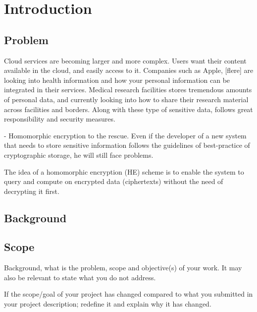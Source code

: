 \chapter{Introduction}
\label{chp:introduction}

\section{Problem}

Cloud services are becoming larger and more complex. Users want their content available in the cloud, and easily access to it. Companies such as Apple, [flere] are looking into health information and how your personal information can be integrated in their services. Medical research facilities stores tremendous amounts of personal data, and currently looking into how to share their research material across facilities and borders. \cite{iDASH} Along with these type of sensitive data, follows great responsibility and security measures. 


- Homomorphic encryption to the rescue. Even if the developer of a new system that needs to store sensitive information follows the guidelines of best-practice of cryptographic storage, he will still face problems.

The idea of a homomorphic encryption (HE) scheme is to enable the system to query and compute on encrypted data (ciphertexts) without the need of decrypting it first. 

\section{Background}

\section{Scope}


Background, what is the problem, scope and objective(s) of your 
work. It may also be relevant to state what you do not 
address.

If the scope/goal of your project has changed compared to what you submitted in your project description; redefine it and  explain why it has changed.